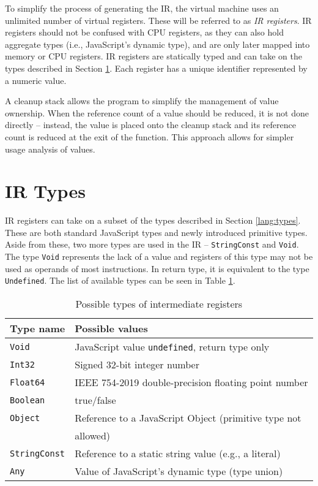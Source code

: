 To simplify the process of generating the IR, the virtual machine uses an unlimited number of virtual registers. These will be referred to as \textit{IR registers}. IR registers should not be confused with CPU registers, as they can also hold aggregate types (i.e., JavaScript's dynamic type), and are only later mapped into memory or CPU registers. IR registers are statically typed and can take on the types described in Section \ref{ir:types}. Each register has a unique identifier represented by a numeric value.

A cleanup stack allows the program to simplify the management of value ownership. When the reference count of a value should be reduced, it is not done directly -- instead, the value is placed onto the cleanup stack and its reference count is reduced at the exit of the function. This approach allows for simpler usage analysis of values.


\section{IR Types}\label{ir:types}

IR registers can take on a subset of the types described in Section \ref{lang:types}. These are both standard JavaScript types and newly introduced primitive types. Aside from these, two more types are used in the IR -- \texttt{StringConst} and \texttt{Void}. The type \texttt{Void} represents the lack of a value and registers of this type may not be used as operands of most instructions. In return type, it is equivalent to the type \texttt{Undefined}. The list of available types can be seen in Table \ref{tab:types}.

\begin{table}[H]
    \centering
    \begin{tabular}{l | l}
        Type name            & Possible values                                                \\\hline
        \texttt{Void}        & JavaScript value \texttt{undefined}, return type only          \\
        \texttt{Int32}       & Signed 32-bit integer number                                   \\
        \texttt{Float64}     & IEEE 754-2019 double-precision floating point number           \\
        \texttt{Boolean}     & true/false                                                     \\
        \texttt{Object}      & Reference to a JavaScript Object (primitive type not           \\
                             & allowed)  \\
        \texttt{StringConst} & Reference to a static string value (e.g., a literal)           \\
        \texttt{Any}         & Value of JavaScript's dynamic type (type union)
    \end{tabular}
    \caption{Possible types of intermediate registers}
    \label{tab:types}
\end{table}


